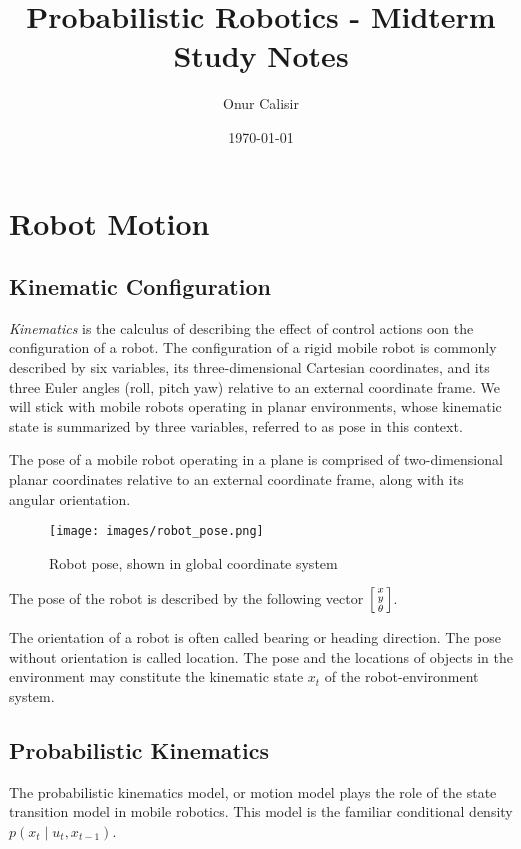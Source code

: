 \documentclass[14pt,letterpaper]{article}
\title{Probabilistic Robotics - Midterm Study Notes}
\author{Onur Calisir}
\date{\today}
\theoremstyle{definition}
\newcommand{\pcond}[2]{p(#1 \mid #2)}
\begin{document}
\maketitle
\tableofcontents
\newpage

\newpage

\newpage

\newpage
\section{Robot Motion}

\subsection{Kinematic Configuration}
\textit{Kinematics} is the calculus of describing the effect of control actions oon the configuration of a robot. The configuration of a rigid mobile robot is commonly
described by six variables, its three-dimensional Cartesian coordinates, and its three Euler angles (roll, pitch yaw) relative to an external coordinate frame.
We will stick with mobile robots operating in planar environments, whose kinematic state is summarized by three variables, referred to as pose in this context.

The pose of a mobile robot operating in a plane is comprised of two-dimensional planar coordinates relative to an external coordinate frame, along with its angular orientation.
\begin{figure}[H]
  \begin{center}
    \texttt{[image: images/robot\_pose.png]}
  \end{center}
  \caption{Robot pose, shown in global coordinate system}\label{fig:Robot Pose}
\end{figure}
The pose of the robot is described by the following vector $\begin{bsmallmatrix}x \\ y \\ \theta \end{bsmallmatrix}$.

The orientation of a robot is often called bearing or heading direction. The pose without orientation is called location.
The pose and the locations of objects in the environment may constitute the kinematic state $x_t$ of the robot-environment system.

\subsection{Probabilistic Kinematics}
The probabilistic kinematics model, or motion model plays the role of the state transition model in mobile robotics. This model is the familiar conditional density $\pcond{x_t}{u_t, x_{t-1}}$.
\end{document}
